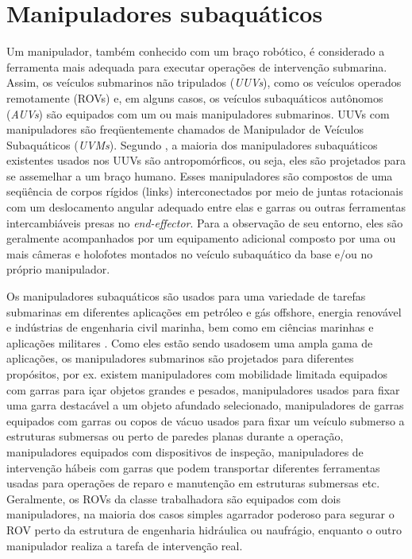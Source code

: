 
\section{Manipuladores subaquáticos}
\label{chap:sotamani}



Um manipulador, também conhecido com um braço robótico, é considerado a ferramenta mais adequada para executar operações de intervenção submarina. Assim, os veículos submarinos não tripulados (\textit{\acs{UUV}s}), como os veículos operados remotamente (ROVs) e, em alguns casos, os veículos subaquáticos autônomos (\textit{\acs{AUV}s}) são equipados com um ou mais manipuladores submarinos. UUVs com manipuladores são freqüentemente chamados de Manipulador de Veículos Subaquáticos (\textit{\acs{UVM}s}). Segundo \cite{sivvcev2018underwater}, a maioria dos manipuladores subaquáticos existentes usados ​​nos UUVs são antropomórficos, ou seja, eles são projetados para se assemelhar a um braço humano. Esses manipuladores são compostos de uma seqüência de corpos rígidos (links) interconectados por meio de juntas rotacionais com um deslocamento angular adequado entre elas e garras ou outras ferramentas intercambiáveis ​​presas no \textit{end-effector}. Para a observação de seu entorno, eles são geralmente acompanhados por um equipamento adicional composto por uma ou mais câmeras e holofotes montados no veículo subaquático da base e/ou no próprio manipulador.

Os manipuladores subaquáticos são usados ​​para uma variedade de tarefas submarinas em diferentes aplicações em petróleo e gás offshore, energia renovável e indústrias de engenharia civil marinha, bem como em ciências marinhas e aplicações militares \cite{capocci2017inspection}. Como eles estão sendo usados ​​em uma ampla gama de aplicações, os manipuladores submarinos são projetados para diferentes propósitos, por ex. existem manipuladores com mobilidade limitada equipados com garras para içar objetos grandes e pesados, manipuladores usados ​​para fixar uma garra destacável a um objeto afundado selecionado, manipuladores de garras equipados com garras ou copos de vácuo usados ​​para fixar um veículo submerso a estruturas submersas ou perto de paredes planas durante a operação, manipuladores equipados com dispositivos de inspeção, manipuladores de intervenção hábeis com garras que podem transportar diferentes ferramentas usadas para operações de reparo e manutenção em estruturas submersas etc. Geralmente, os ROVs da classe trabalhadora são equipados com dois manipuladores, na maioria dos casos simples agarrador poderoso para segurar o ROV perto da estrutura de engenharia hidráulica ou naufrágio, enquanto o outro manipulador realiza a tarefa de intervenção real.

